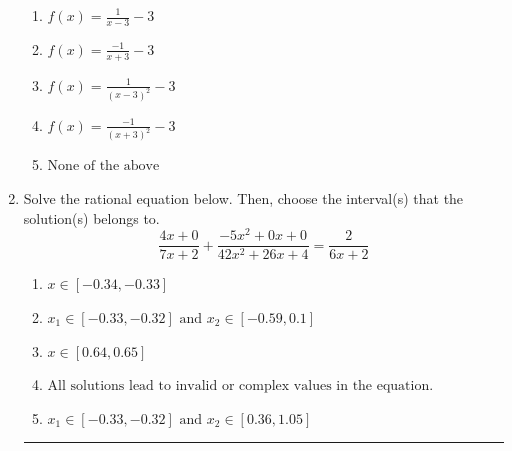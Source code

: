 \documentclass[14pt]{extbook}
\newcommand{\litem}[1]{\item#1\hspace*{-1cm}\rule{\textwidth}{0.4pt}}
\begin{document}
\begin{enumerate}
{\begin{center}
\end{center}
\begin{enumerate}[label=\Alph*.]
\item \( f(x) = \frac{1}{x - 3} - 3 \)
\item \( f(x) = \frac{-1}{x + 3} - 3 \)
\item \( f(x) = \frac{1}{(x - 3)^2} - 3 \)
\item \( f(x) = \frac{-1}{(x + 3)^2} - 3 \)
\item \( \text{None of the above} \)

\end{enumerate} }
\litem{
Solve the rational equation below. Then, choose the interval(s) that the solution(s) belongs to.\[ \frac{4x + 0}{7x + 2} + \frac{-5x^{2} +0 x + 0}{42x^{2} +26 x + 4} = \frac{2}{6x + 2} \]\begin{enumerate}[label=\Alph*.]
\item \( x \in [-0.34,-0.33] \)
\item \( x_1 \in [-0.33, -0.32] \text{ and } x_2 \in [-0.59,0.1] \)
\item \( x \in [0.64,0.65] \)
\item \( \text{All solutions lead to invalid or complex values in the equation.} \)
\item \( x_1 \in [-0.33, -0.32] \text{ and } x_2 \in [0.36,1.05] \)

\end{enumerate} }
\end{enumerate}
\end{document}
